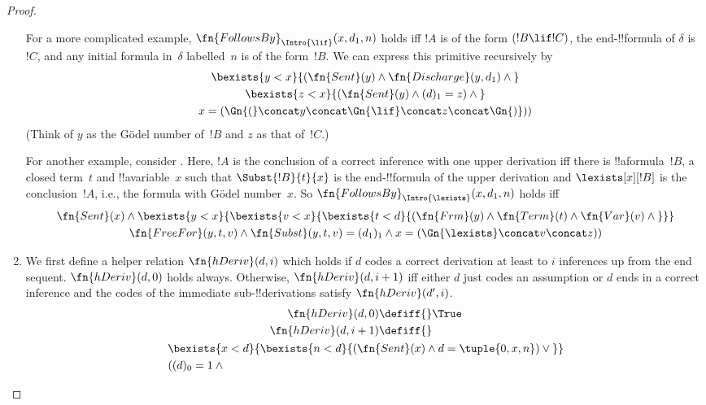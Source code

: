 \documentclass[../../../include/open-logic-section]{subfiles}
\begin{document}
\begin{proof}
\begin{enumerate}
  For a more complicated example, $\fn{FollowsBy}_{\Intro{\lif}}(x, d_1,
    n)$ holds iff $!A$ is of the form $(!B \lif !C)$, the
  end-!!{formula} of $\delta$ is~$!C$, and any initial formula
  in~$\delta$ labelled~$n$ is of the form~$!B$.  We can express this
  primitive recursively by
  \begin{multline*}
    \bexists{y<x}{(\fn{Sent}(y) \land \fn{Discharge}(y, d_1) \land {}}\\
      \bexists{z<x}{(\fn{Sent}(y)  \land  (d)_1 = z) \land {}}\\
      x = (\Gn{(} \concat y \concat \Gn{\lif}
  \concat z\concat \Gn{)}))
  \end{multline*}
  (Think of $y$ as the G\"odel number of~$!B$ and $z$ as that
  of~$!C$.)

  For another example, consider \Intro{\lexists}.  Here, $!A$ is the
  conclusion of a correct inference with one upper derivation iff
  there is !!a{formula}~$!B$, a closed term~$t$ and
  !!a{variable}~$x$ such that $\Subst{!B}{t}{x}$ is the
  end-!!{formula} of the upper derivation and $\lexists[x][!B]$
  is the conclusion~$!A$, i.e., the formula with G\"odel number~$x$.
  So $\fn{FollowsBy}_{\Intro{\lexists}}(x, d_1, n)$ holds iff
\begin{multline*}
\fn{Sent}(x) \land \bexists{y < x}{\bexists{v<x}{\bexists{t<d}{
(\fn{Frm}(y) \land \fn{Term}(t) \land \fn{Var}(v)  \land {}}}}\\
\fn{FreeFor}(y, t, v) \land \fn{Subst}(y,t,v) = (d_1)_1 \land
x = (\Gn{\lexists} \concat v \concat z))
\end{multline*}
\item We first define a helper relation $\fn{hDeriv}(d, i)$ which
  holds if $d$ codes a correct derivation at least to $i$ inferences
  up from the end sequent.  $\fn{hDeriv}(d, 0)$ holds always.
  Otherwise, $\fn{hDeriv}(d, i+1)$ iff either $d$ just codes an
  assumption or $d$ ends in a correct inference and the codes of the
  immediate sub-!!{derivation}s satisfy $\fn{hDeriv}(d', i)$.
\begin{multline*}
  \begin{aligned}
\fn{hDeriv}(d, 0) \defiff {} & \True \\
\fn{hDeriv}(d, i+1) \defiff {} &
  \end{aligned}\\
  \begin{aligned}
& \bexists{x<d}{\bexists{n<d}{(\fn{Sent}(x) \land d = \tuple{0, x, n}) \lor {}}}\\
& ((d)_0 = 1 \land {}\\

\end{aligned}
\end{multline*}
\end{enumerate}
\end{proof}
\end{document}
